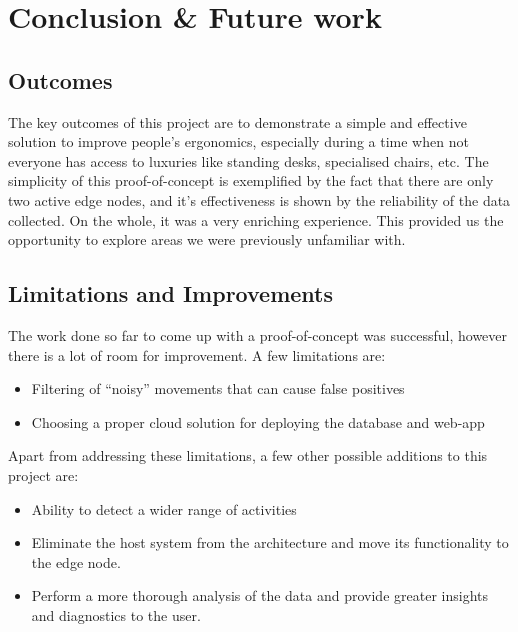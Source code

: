 \documentclass[./main.tex]{subfiles}
\begin{document}
\chapter{Conclusion \& Future work}\label{chap:concl}
\section{Outcomes}\label{sec:conclout}
The key outcomes of this project are to demonstrate a simple and effective
solution to improve people's ergonomics, especially during a time when not
everyone has access to luxuries like standing desks, specialised chairs, etc.
The simplicity of this proof-of-concept is exemplified by the fact that there
are only two active edge nodes, and it's effectiveness is shown by the
reliability of the data collected. On the whole, it was a very enriching
experience. This provided us the opportunity to explore areas we were
previously unfamiliar with.

\section{Limitations and Improvements}\label{sec:concllim}
The work done so far to come up with a proof-of-concept was successful, however
there is a lot of room for improvement. A few limitations are:
\begin{itemize}
    \item Filtering of ``noisy'' movements that can cause false positives
    \item Choosing a proper cloud solution for deploying the database and
        web-app
\end{itemize}

Apart from addressing these limitations, a few other possible additions to this
project are:
\begin{itemize}
    \item Ability to detect a wider range of activities
    \item Eliminate the host system from the architecture and move its
        functionality to the edge node.
    \item Perform a more thorough analysis of the data and provide greater
        insights and diagnostics to the user.
\end{itemize}
\end{document}
